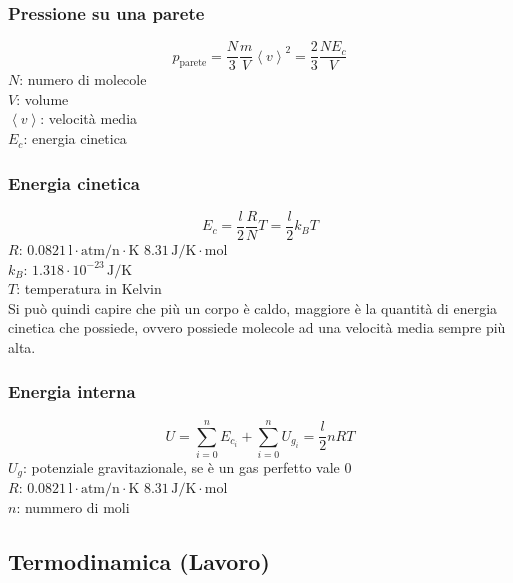 \subsubsection{Pressione su una parete}
\begin{equation*}
  p_{\text{parete}}=\frac{N}{3}\frac{m}{V}\left\langle v\right\rangle^2 = \frac{2}{3}\frac{NE_c}{V}
\end{equation*}
$N$: numero di molecole\\
$V$: volume\\
$\left\langle v\right\rangle$: velocità media\\
$E_c$: energia cinetica\\

\subsubsection{Energia cinetica}
\begin{equation*}
  E_c = \frac{l}{2}\frac{R}{N}T = \frac{l}{2}k_BT
\end{equation*}
\hyperref[tab:R]{$R$}: $0.0821\,\text{l}\cdot\text{atm/n}\cdot\text{K}$
$8.31\,\text{J/K}\cdot\text{mol}$\\
\hyperref[tab:kB]{$k_B$}: $1.318\cdot10^{-23}\,\text{J/K}$\\
$T$: temperatura in Kelvin\\[\baselineskip]

Si può quindi capire che più un corpo è caldo, maggiore è la quantità di energia cinetica che possiede,
ovvero possiede molecole ad una velocità media sempre più alta.

\subsubsection{Energia interna}
\begin{equation*}
  U = \sum\limits_{i=0}^{n} E_{c_i} + \sum\limits_{i=0}^{n} U_{g_i} = \frac{l}{2}nRT
\end{equation*}
$U_g$: potenziale gravitazionale, se è un gas perfetto vale $0$\\
\hyperref[tab:R]{$R$}: $0.0821\,\text{l}\cdot\text{atm/n}\cdot\text{K}$
$8.31\,\text{J/K}\cdot\text{mol}$\\
$n$: nummero di moli

\subsection{Termodinamica (Lavoro)}


